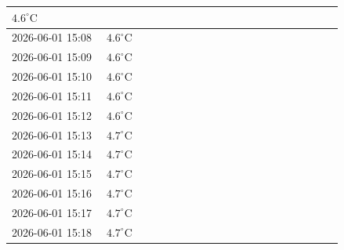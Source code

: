 \documentclass[UTF8,10pt,a4paper,fontset=fandol]{ctexart}
\newcommand{\fieldvalue}[1]{#1}
\begin{document}
\begin{tabular}{|p{0.24\linewidth}|p{0.18\linewidth}|p{0.24\linewidth}|p{0.18\linewidth}|}
\fieldvalue{$4.6^\circ\mathrm{C}$} & & \\ \hline
\fieldvalue{2026-06-01 15:08} &
\fieldvalue{$4.6^\circ\mathrm{C}$} & & \\ \hline
\fieldvalue{2026-06-01 15:09} &
\fieldvalue{$4.6^\circ\mathrm{C}$} & & \\ \hline
\fieldvalue{2026-06-01 15:10} &
\fieldvalue{$4.6^\circ\mathrm{C}$} & & \\ \hline
\fieldvalue{2026-06-01 15:11} &
\fieldvalue{$4.6^\circ\mathrm{C}$} & & \\ \hline
\fieldvalue{2026-06-01 15:12} &
\fieldvalue{$4.6^\circ\mathrm{C}$} & & \\ \hline
\fieldvalue{2026-06-01 15:13} &
\fieldvalue{$4.7^\circ\mathrm{C}$} & & \\ \hline
\fieldvalue{2026-06-01 15:14} &
\fieldvalue{$4.7^\circ\mathrm{C}$} & & \\ \hline
\fieldvalue{2026-06-01 15:15} &
\fieldvalue{$4.7^\circ\mathrm{C}$} & & \\ \hline
\fieldvalue{2026-06-01 15:16} &
\fieldvalue{$4.7^\circ\mathrm{C}$} & & \\ \hline
\fieldvalue{2026-06-01 15:17} &
\fieldvalue{$4.7^\circ\mathrm{C}$} & & \\ \hline
\fieldvalue{2026-06-01 15:18} &
\fieldvalue{$4.7^\circ\mathrm{C}$} & & \\ \hline

\end{tabular}
\end{document}
